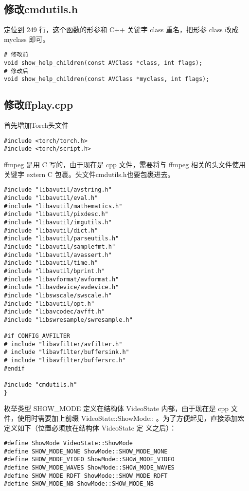 \subsection{修改cmdutils.h}

定位到 249 行，这个函数的形参和 C++ 关键字 class 重名，把形参 class 改成 myclass 即可。

\begin{lstlisting}
# 修改前
void show_help_children(const AVClass *class, int flags);
# 修改后
void show_help_children(const AVClass *myclass, int flags);
\end{lstlisting}

\subsection{修改ffplay.cpp}

首先增加Torch头文件

\begin{lstlisting}
#include <torch/torch.h>
#include <torch/script.h>
\end{lstlisting}

ffmpeg 是用 C 写的，由于现在是 cpp 文件，需要将与 ffmpeg 相关的头文件使用关键字
extern C {} 包裹。头文件cmdutils.h也要包裹进去。

\begin{lstlisting}
#include "libavutil/avstring.h"
#include "libavutil/eval.h"
#include "libavutil/mathematics.h"
#include "libavutil/pixdesc.h"
#include "libavutil/imgutils.h"
#include "libavutil/dict.h"
#include "libavutil/parseutils.h"
#include "libavutil/samplefmt.h"
#include "libavutil/avassert.h"
#include "libavutil/time.h"
#include "libavutil/bprint.h"
#include "libavformat/avformat.h"
#include "libavdevice/avdevice.h"
#include "libswscale/swscale.h"
#include "libavutil/opt.h"
#include "libavcodec/avfft.h"
#include "libswresample/swresample.h"

#if CONFIG_AVFILTER
# include "libavfilter/avfilter.h"
# include "libavfilter/buffersink.h"
# include "libavfilter/buffersrc.h"
#endif

#include "cmdutils.h"
}
\end{lstlisting}

枚举类型 SHOW\_MODE 定义在结构体 VideoState 内部，由于现在是 cpp 文件，使用时需要加上前缀
VideoState::ShowMode:: 。为了方便起见，直接添加宏定义如下（位置必须放在结构体 VideoState 定
义之后）：

\begin{lstlisting}
#define ShowMode VideoState::ShowMode
#define SHOW_MODE_NONE ShowMode::SHOW_MODE_NONE
#define SHOW_MODE_VIDEO ShowMode::SHOW_MODE_VIDEO
#define SHOW_MODE_WAVES ShowMode::SHOW_MODE_WAVES
#define SHOW_MODE_RDFT ShowMode::SHOW_MODE_RDFT
#define SHOW_MODE_NB ShowMode::SHOW_MODE_NB
\end{lstlisting}


